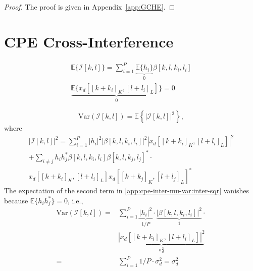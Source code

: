 \documentclass[journal]{IEEEtran}
\begin{document}
\begin{proof}
The proof is given in Appendix~\ref{app:GCHE}.
\end{proof}


\appendices
\section{CPE Cross-Interference} \label{app:cpe-inter-mu-var}
\begin{multline}
\mathbb{E}\{\mathcal{I}[k, l]\} = \sum_{i=1}^P \underbrace{\mathbb{E}\{h_i\}}_{0} \beta[k, l, k_i, l_i] \\
\underbrace{\mathbb{E}\{x_d[[k+k_i]_K, [l+l_i]_L]\}}_{0} = 0
\end{multline}

\begin{equation}
\text{Var}(\mathcal{I}[k, l]) = \mathbb{E}\left\{ |\mathcal{I}[k, l]|^2 \right\},
\end{equation}
where
\begin{multline}
|\mathcal{I}[k, l]|^2 = \sum_{i=1}^P |h_i|^2 |\beta[k, l, k_i, l_i]|^2
|x_d[[k+k_i]_K, [l+l_i]_L]|^2 \\
+ \sum_{i \neq j} h_ih_j^*\beta[k, l, k_i, l_i]\beta[k, l, k_j, l_j]^*\cdot \\
x_d[[k+k_i]_K, [l+l_i]_L]x_d[[k+k_j]_K, [l+l_j]_L]^*
\label{app:cpe-inter-mu-var:inter-sqr}
\end{multline}
The expectation of the second term in \eqref{app:cpe-inter-mu-var:inter-sqr} vanishes because $\mathbb{E}\{h_i h_j^*\} = 0$, i.e.,
\begin{equation}
\begin{split}
\text{Var}(\mathcal{I}[k, l]) =& \sum_{i=1}^P \underbrace{|h_i|^2}_{1/P} \cdot \underbrace{|\beta[k, l, k_i, l_i]|^2}_{1} \cdot \\
&\underbrace{|x_d[[k+k_i]_K, [l+l_i]_L]|^2}_{\sigma_d^2}\\
=& \sum_{i=1}^P 1/P\cdot\sigma_d^2 = \sigma_d^2
\end{split}
\end{equation}
\end{document}
